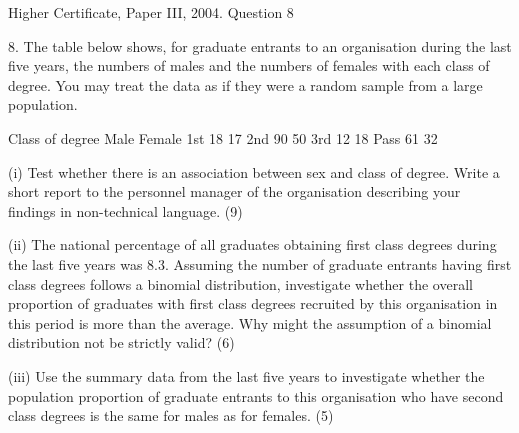 \documentclass[a4paper,12pt]{article}
\begin{document}
Higher Certificate, Paper III, 2004.  Question 8 
\begin{framed}
8. The table below shows, for graduate entrants to an organisation during the last five years, the numbers of males and the numbers of females with each class of degree.  You may treat the data as if they were a random sample from a large population. 
 
Class of degree Male Female 1st 18 17 2nd 90 50 3rd 12 18 Pass 61 32 
 
 
(i) Test whether there is an association between sex and class of degree.  Write a short report to the personnel manager of the organisation describing your findings in non-technical language. (9) 
 
(ii) The national percentage of all graduates obtaining first class degrees during the last five years was 8.3.  Assuming the number of graduate entrants having first class degrees follows a binomial distribution, investigate whether the overall proportion of graduates with first class degrees recruited by this organisation in this period is more than the average.  Why might the assumption of a binomial distribution not be strictly valid? (6) 
 
(iii) Use the summary data from the last five years to investigate whether the population proportion of graduate entrants to this organisation who have second class degrees is the same for males as for females. (5) 
 
\end{framed} 
\end{document}
